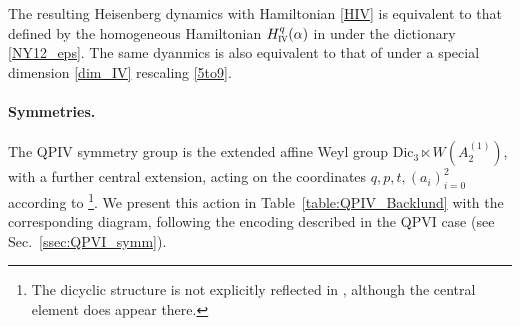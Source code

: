 \documentclass[12pt,a4paper]{article}
\numberwithin{equation}{section}
\newcommand{\IV}{\scalebox{.6}{IV}}
\begin{document}
The resulting Heisenberg dynamics with Hamiltonian \eqref{HIV} is
equivalent to that defined by the homogeneous Hamiltonian $H^q_{\IV}(\alpha)$ in \cite[Sec. 2.3]{NY12} under the dictionary \eqref{NY12_eps}. The same dyanmics is also equivalent to that of
\cite[Sec. 4]{N12} under a special dimension \eqref{dim_IV} rescaling \eqref{5to9}.

\paragraph{Symmetries.}
The QPIV symmetry group is the extended affine Weyl group $\mathrm{Dic}_3 \ltimes W\left(A_2^{(1)}\right)$, with a further central extension, acting on the coordinates $q,p,t,(a_i)_{i=0}^2$ according to \cite[Definition 2.11]{NY12}\footnote{The dicyclic structure is not explicitly reflected in \cite[Sec. 2.3]{NY12}, although the central element does appear there.}. We present this action in Table~\ref{table:QPIV_Backlund} with the corresponding diagram, following the encoding described in the QPVI case (see Sec.~\ref{ssec:QPVI_symm}).
\end{document}
